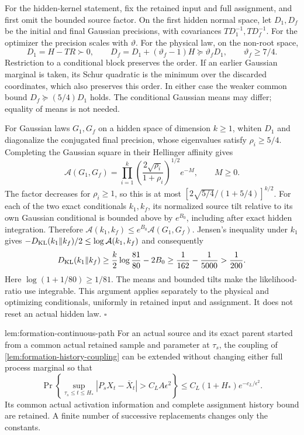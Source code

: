 For the hidden-kernel statement, fix the retained input and full
assignment, and first omit the bounded source factor. On the first
hidden normal space, let $D_1,D_f$ be the initial and final Gaussian
precisions, with covariances $TD_1^{-1},TD_f^{-1}$. For the optimizer
the precision scales with $\vartheta$. For the physical law,
on the non-root space,
\begin{equation}
 D_1=H-TR\succ0,
 \qquad
 D_f=D_1+(\vartheta_f-1)H
       \succeq\vartheta_fD_1,
 \qquad \vartheta_f\ge7/4.
 \label{eq:rg-formation-physical-precision-growth}
\end{equation}
Restriction to a conditional block preserves the order. If an
earlier Gaussian marginal is taken, its Schur quadratic is the
minimum over the discarded coordinates, which also preserves this
order. In either case the weaker common bound
$D_f\succeq(5/4)D_1$ holds. The conditional Gaussian means may
differ; equality of means is not needed.

For Gaussian laws $G_1,G_f$ on a hidden space of dimension $k\ge1$,
whiten $D_1$ and diagonalize the conjugated final precision, whose
eigenvalues satisfy $\rho_i\ge5/4$. Completing the Gaussian square
in their Hellinger affinity gives
\begin{equation}
 \mathcal A(G_1,G_f)
 =\prod_{i=1}^k
       \left(\frac{2\sqrt{\rho_i}}{1+\rho_i}\right)^{1/2}
       e^{-M},
 \qquad M\ge0.
 \label{eq:rg-formation-gaussian-affinity}
\end{equation}
The factor decreases for $\rho_i\ge1$, so this is at most
$[2\sqrt{5/4}/(1+5/4)]^{k/2}$. For each of the two exact
conditionals $k_1,k_f$, its normalized source tilt relative to its
own Gaussian conditional is bounded above by $e^{B_0}$, including
after exact hidden integration. Therefore
$\mathcal A(k_1,k_f)\le e^{B_0}\mathcal A(G_1,G_f)$.
Jensen's inequality under $k_1$ gives
$-D_{\mathrm{KL}}(k_1\Vert k_f)/2\le\log\mathcal A(k_1,k_f)$ and consequently
\begin{equation}
 D_{\mathrm{KL}}(k_1\Vert k_f)
 \ge\frac{k}{2}\log\frac{81}{80}-2B_0
 \ge\frac1{162}-\frac1{5000}>\frac1{200}.
 \label{eq:rg-formation-hidden-kernel-change}
\end{equation}
Here $\log(1+1/80)\ge1/81$. The means and bounded tilts make the
likelihood-ratio use integrable. This argument applies separately
to the physical and optimizing conditionals, uniformly in retained
input and assignment. It does not reset an actual hidden law.
\hfill$\square$

{lem:formation-continuous-path}
For an actual source and its exact parent started from a common
actual retained sample and parameter at $\tau_s$, the coupling of
\cref{lem:formation-history-coupling} can be extended without
changing either full process marginal so that
\begin{equation}
 \Pr\left\{\sup_{\tau_s\le t\le H_*}
 |P_sX_t-\overline X_t|>C_LA\epsilon^2\right\}
 \le C_L(1+H_*)e^{-c_L/\epsilon^2}.
 \label{eq:rg-formation-continuous-displacement-proof}
\end{equation}
Its common actual activation information and complete assignment
history bound are retained. A finite number of successive
replacements changes only the constants. 

